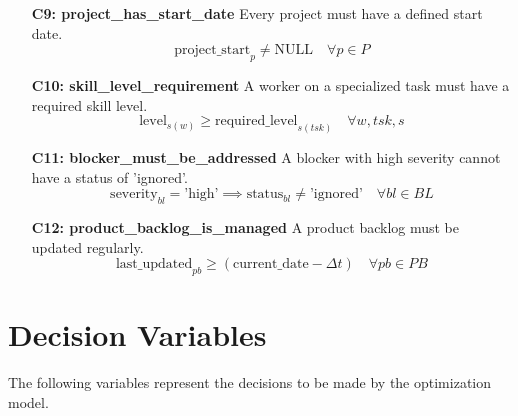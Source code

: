 \documentclass[11pt]{article}
\begin{document}
\begin{itemize}
    \item[\textbf{C9: project\_has\_start\_date}] Every project must have a defined start date.
    $$ \text{project\_start}_{p} \neq \text{NULL} \quad \forall p \in P $$
    
    \item[\textbf{C10: skill\_level\_requirement}] A worker on a specialized task must have a required skill level.
    $$ \text{level}_{s(w)} \geq \text{required\_level}_{s(tsk)} \quad \forall w, tsk, s $$

    \item[\textbf{C11: blocker\_must\_be\_addressed}] A blocker with high severity cannot have a status of 'ignored'.
    $$ \text{severity}_{bl} = \text{'high'} \implies \text{status}_{bl} \neq \text{'ignored'} \quad \forall bl \in BL $$
    
    \item[\textbf{C12: product\_backlog\_is\_managed}] A product backlog must be updated regularly.
    $$ \text{last\_updated}_{pb} \geq (\text{current\_date} - \Delta t) \quad \forall pb \in PB $$
\end{itemize}


\section{Decision Variables}
The following variables represent the decisions to be made by the optimization model.
\end{document}
